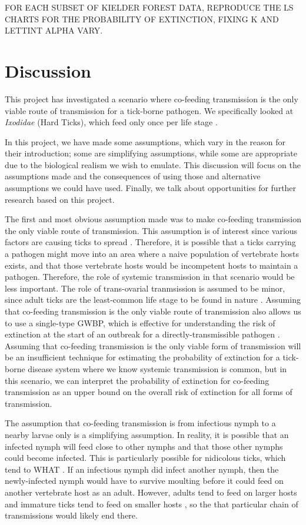 \documentclass{article}
\begin{document}
FOR EACH SUBSET OF KIELDER FOREST DATA, REPRODUCE THE LS CHARTS FOR THE PROBABILITY OF EXTINCTION, FIXING K AND LETTINT ALPHA VARY.

\newpage

\section{Discussion}

This project has investigated a scenario where co-feeding transmission is the only viable route of transmission for a tick-borne pathogen. We specifically looked at \textit{Ixodidae} (Hard Ticks), which feed only once per life stage \cite{}.

In this project, we have made some assumptions, which vary in the reason for their introduction; some are simplifying assumptions, while some are appropriate due to the biological realism we wish to emulate. This discussion will focus on the assumptions made and the consequences of using those and alternative assumptions we could have used. Finally, we talk about opportunities for further research based on this project.

The first and most obvious assumption made was to make co-feeding transmission the only viable route of transmission. This assumption is of interest since various factors are causing ticks to spread \cite{}. Therefore, it is possible that a ticks carrying a pathogen might move into an area where a naive population of vertebrate hosts exists, and that those vertebrate hosts would be incompetent hosts to maintain a pathogen. Therefore, the role of systemic transmission in that scenario would be less important. The role of trans-ovarial tranmsission is assumed to be minor, since adult ticks are the least-common life stage to be found in nature \cite{}. Assuming that co-feeding transmission is the only viable route of transmission also allows us to use a single-type GWBP, which is effective for understanding the risk of extinction at the start of an outbreak for a directly-transmissible pathogen \cite{}. Assuming that co-feeding transmission is the only viable form of transmission will be an insufficient technique for estimating the probability of extinction for a tick-borne disease system where we know systemic transmission is common, but in this scenario, we can interpret the probability of extinction for co-feeding transmission as an upper bound on the overall risk of extinction for all forms of transmission.

The assumption that co-feeding transmission is from infectious nymph to a nearby larvae only is a simplifying assumption. In reality, it is possible that an infected nymph will feed close to other nymphs and that those other nymphs could become infected. This is particularly possible for nidicolous ticks, which tend to WHAT \cite{}. If an infectious nymph did infect another nymph, then the newly-infected nymph would have to survive moulting before it could feed on another vertebrate host as an adult. However, adults tend to feed on larger hosts and immature ticks tend to feed on smaller hosts \cite{}, so the that particular chain of transmissions would likely end there.
\end{document}
